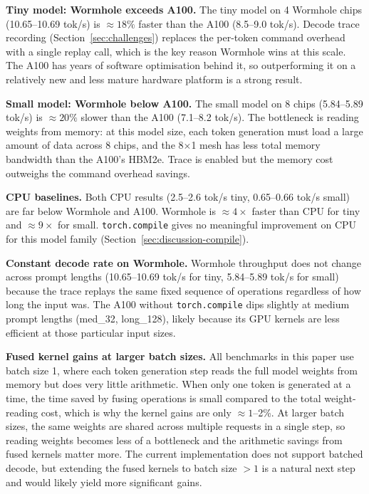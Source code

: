 \textbf{Tiny model: Wormhole exceeds A100.}
The tiny model on 4 Wormhole chips (10.65--10.69 tok/s) is ${\approx}18\%$ faster than the A100 (8.5--9.0 tok/s). Decode trace recording (Section~\ref{sec:challenges}) replaces the per-token command overhead with a single replay call, which is the key reason Wormhole wins at this scale. The A100 has years of software optimisation behind it, so outperforming it on a relatively new and less mature hardware platform is a strong result.

\textbf{Small model: Wormhole below A100.}
The small model on 8 chips (5.84--5.89 tok/s) is ${\approx}20\%$ slower than the A100 (7.1--8.2 tok/s). The bottleneck is reading weights from memory: at this model size, each token generation must load a large amount of data across 8 chips, and the 8$\times$1 mesh has less total memory bandwidth than the A100's HBM2e. Trace is enabled but the memory cost outweighs the command overhead savings.

\textbf{CPU baselines.}
Both CPU results (2.5--2.6 tok/s tiny, 0.65--0.66 tok/s small) are far below Wormhole and A100. Wormhole is ${\approx}4\times$ faster than CPU for tiny and ${\approx}9\times$ for small. \texttt{torch.compile} gives no meaningful improvement on CPU for this model family (Section~\ref{sec:discussion-compile}).

\textbf{Constant decode rate on Wormhole.}
Wormhole throughput does not change across prompt lengths (10.65--10.69 tok/s for tiny, 5.84--5.89 tok/s for small) because the trace replays the same fixed sequence of operations regardless of how long the input was. The A100 without \texttt{torch.compile} dips slightly at medium prompt lengths (med\_32, long\_128), likely because its GPU kernels are less efficient at those particular input sizes.

\textbf{Fused kernel gains at larger batch sizes.}
All benchmarks in this paper use batch size 1, where each token generation step reads the full model weights from memory but does very little arithmetic. When only one token is generated at a time, the time saved by fusing operations is small compared to the total weight-reading cost, which is why the kernel gains are only ${\approx}1$--2\%. At larger batch sizes, the same weights are shared across multiple requests in a single step, so reading weights becomes less of a bottleneck and the arithmetic savings from fused kernels matter more. The current implementation does not support batched decode, but extending the fused kernels to batch size $>1$ is a natural next step and would likely yield more significant gains.

